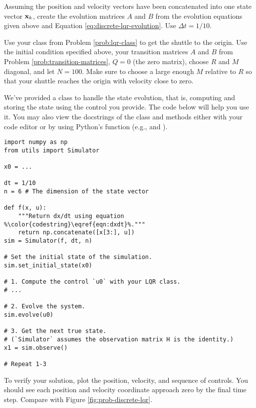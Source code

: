 \begin{problem}
Assuming the position and velocity vectors have been concatenated into one state vector $\mathbf{x}_k$, create the evolution matrices $A$ and $B$ from the evolution equations given above and Equation \ref{eq:discrete-lqr-evolution}.
Use $\Delta t = 1/10$.
\label{prob:transition-matrices}
\end{problem}

\begin{problem}
Use your  class from Problem \ref{prob:lqr-class} to get the shuttle to the origin.
Use the initial condition specified above, your transition matrices $A$ and $B$ from Problem \ref{prob:transition-matrices}, $Q = 0$ (the zero matrix), choose $R$ and $M$ diagonal, and let $N = 100$.
Make sure to choose a large enough $M$ relative to $R$ so that your shuttle reaches the origin with velocity close to zero.

We've provided a  class to handle the state evolution, that is, computing and storing the state using the control you provide.
The code below will help you use it.
You may also view the docstrings of the class and methods either with your code editor or by using Python's  function (e.g.,  and ).

\begin{lstlisting}[escapechar=\%]
import numpy as np
from utils import Simulator

x0 = ...

dt = 1/10
n = 6 # The dimension of the state vector

def f(x, u):
    """Return dx/dt using equation %\color{codestring}\eqref{eqn:dxdt}%."""
    return np.concatenate([x[3:], u])
sim = Simulator(f, dt, n)

# Set the initial state of the simulation.
sim.set_initial_state(x0)

# 1. Compute the control `u0` with your LQR class.
# ...

# 2. Evolve the system.
sim.evolve(u0)

# 3. Get the next true state.
# (`Simulator` assumes the observation matrix H is the identity.)
x1 = sim.observe()

# Repeat 1-3
\end{lstlisting}

To verify your solution, plot the position, velocity, and sequence of controls.
You should see each position and velocity coordinate approach zero by the final time step.
Compare with Figure \ref{fig:prob-discrete-lqr}.
\label{prob:discrete-lqr}
\end{problem}

